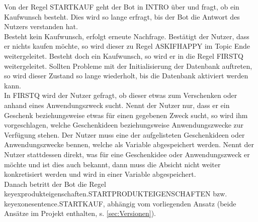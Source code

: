 Von der Regel STARTKAUF geht der Bot in INTRO über und fragt, ob ein Kaufwunsch besteht. Dies wird so lange erfragt, bis der Bot die Antwort des Nutzers verstanden hat.\\
Besteht kein Kaufwunsch, erfolgt erneute Nachfrage. Bestätigt der Nutzer, dass er nichts kaufen möchte, so wird dieser zu Regel ASKIFHAPPY im Topic Ende weitergeleitet. Besteht doch ein Kaufwunsch, so wird er in die Regel FIRSTQ weitergeleitet. Sollten Probleme mit der Initialisierung der Datenbank auftreten, so wird dieser Zustand so lange wiederholt, bis die Datenbank aktiviert werden kann. \\
In FIRSTQ wird der Nutzer gefragt, ob dieser etwas zum Verschenken oder anhand eines Anwendungszweck sucht. Nennt der Nutzer nur, dass er ein Geschenk beziehungsweise etwas für einen gegebenen Zweck sucht, so wird ihm vorgeschlagen, welche Geschenkideen beziehungsweise Anwendungszwecke zur Verfügung stehen. Der Nutzer muss eine der aufgelisteten Geschenkideen oder Anwendungszwecke bennen, welche als Variable abgespeichert werden. Nennt der Nutzer stattdessen direkt, was für eine Geschenkidee oder Anwendungszweck er möchte und ist dies auch bekannt, dann muss die Absicht nicht weiter konkretisiert werden und wird in einer Variable abgespeichert. \\
Danach betritt der Bot die Regel keyexprodukteigenschaften.STARTPRODUKTEIGENSCHAFTEN bzw. keyexonesentence.STARTKAUF, abhängig vom vorliegenden Ansatz (beide Ansätze im Projekt enthalten, s. \ref{sec:Versionen}). 

